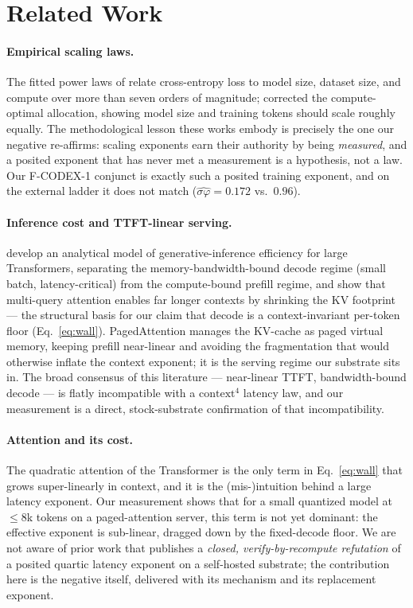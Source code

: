 \documentclass[11pt,a4paper]{article}
\begin{document}
\section{Related Work}
\label{sec:related}

\paragraph{Empirical scaling laws.}
The fitted power laws of \citet{kaplan2020scaling} relate cross-entropy loss to
model size, dataset size, and compute over more than seven orders of magnitude;
\citet{hoffmann2022chinchilla} corrected the compute-optimal allocation,
showing model size and training tokens should scale roughly equally. The
methodological lesson these works embody is precisely the one our negative
re-affirms: scaling exponents earn their authority by being \emph{measured}, and
a posited exponent that has never met a measurement is a hypothesis, not a law.
Our F-CODEX-1 conjunct is exactly such a posited training exponent, and on the
external ladder it does not match (\(\hat{\sigma\varphi} = 0.172\) vs.\ \(0.96\)).

\paragraph{Inference cost and TTFT-linear serving.}
\citet{pope2022efficiently} develop an analytical model of generative-inference
efficiency for large Transformers, separating the memory-bandwidth-bound decode
regime (small batch, latency-critical) from the compute-bound prefill regime,
and show that multi-query attention enables far longer contexts by shrinking the
KV footprint --- the structural basis for our claim that decode is a
context-invariant per-token floor (Eq.~\eqref{eq:wall}). PagedAttention
\citep{kwon2023vllm} manages the KV-cache as paged virtual memory, keeping
prefill near-linear and avoiding the fragmentation that would otherwise inflate
the context exponent; it is the serving regime our substrate sits in. The
broad consensus of this literature --- near-linear TTFT, bandwidth-bound decode
--- is flatly incompatible with a \(\mathrm{context}^4\) latency law, and our
measurement is a direct, stock-substrate confirmation of that incompatibility.

\paragraph{Attention and its cost.}
The quadratic attention of the Transformer \citep{vaswani2017attention} is the
only term in Eq.~\eqref{eq:wall} that grows super-linearly in context, and it is
the (mis-)intuition behind a large latency exponent. Our measurement shows that
for a small quantized model at \(\le\!8\)k tokens on a paged-attention server,
this term is not yet dominant: the effective exponent is sub-linear, dragged
down by the fixed-decode floor. We are not aware of prior work that publishes a
\emph{closed, verify-by-recompute refutation} of a posited quartic latency
exponent on a self-hosted substrate; the contribution here is the negative
itself, delivered with its mechanism and its replacement exponent.
\end{document}
